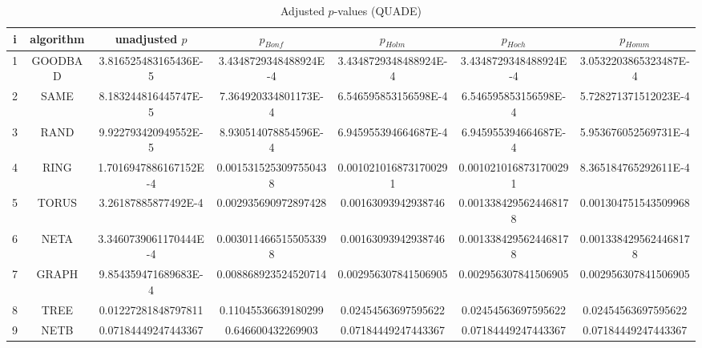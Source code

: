 \documentclass[a4paper,10pt]{article}
\begin{document}
\begin{landscape}
\begin{table}[!htp]
\centering\scriptsize
\caption{Adjusted $p$-values (QUADE)}
\begin{tabular}{ccccccc}
i&algorithm&unadjusted $p$&$p_{Bonf}$&$p_{Holm}$&$p_{Hoch}$&$p_{Homm}$\\
\hline
1& GOODBAD&3.816525483165436E-5&3.4348729348488924E-4&3.4348729348488924E-4&3.4348729348488924E-4&3.0532203865323487E-4\\
2& SAME&8.183244816445747E-5&7.364920334801173E-4&6.546595853156598E-4&6.546595853156598E-4&5.728271371512023E-4\\
3& RAND&9.922793420949552E-5&8.930514078854596E-4&6.945955394664687E-4&6.945955394664687E-4&5.953676052569731E-4\\
4& RING&1.7016947886167152E-4&0.0015315253097550438&0.0010210168731700291&0.0010210168731700291&8.365184765292611E-4\\
5& TORUS&3.26187885877492E-4&0.002935690972897428&0.00163093942938746&0.0013384295624468178&0.001304751543509968\\
6& NETA&3.3460739061170444E-4&0.0030114665155053398&0.00163093942938746&0.0013384295624468178&0.0013384295624468178\\
7& GRAPH&9.854359471689683E-4&0.008868923524520714&0.002956307841506905&0.002956307841506905&0.002956307841506905\\
8& TREE&0.01227281848797811&0.11045536639180299&0.02454563697595622&0.02454563697595622&0.02454563697595622\\
9& NETB&0.07184449247443367&0.646600432269903&0.07184449247443367&0.07184449247443367&0.07184449247443367\\
\hline
\end{tabular}
\end{table}


\end{landscape}
\end{document}

